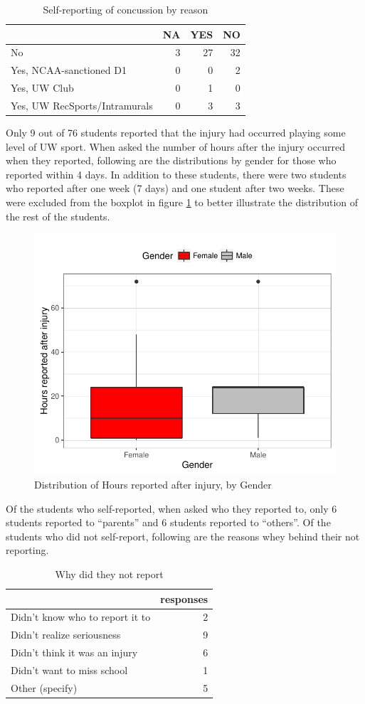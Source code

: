 \documentclass[11]{article}
\begin{document}
\begin{table}[H]
\centering
\begin{tabular}{lrrr}
  \hline
 & NA & YES & NO \\ 
  \hline
No &   3 &  27 &  32 \\ 
  Yes, NCAA-sanctioned D1 &   0 &   0 &   2 \\ 
  Yes, UW Club &   0 &   1 &   0 \\ 
  Yes, UW RecSports/Intramurals &   0 &   3 &   3 \\ 
   \hline
\end{tabular}
\caption{Self-reporting of concussion by reason} 
\label{tab:Tab7Reason}
\end{table}Only 9 out of 76 students reported that the injury had occurred playing some level of UW sport. When asked the number of hours after the injury occurred when they reported, following are the distributions by gender for those who reported within 4 days. In addition to these students, there were two students who reported after one week (7 days) and one student after two weeks. These were excluded from the boxplot in figure \ref{fig:Fig3HoursGender} to better illustrate the distribution of the rest of the students.
\begin{figure}[H]
\centering
\includegraphics[width=0.5\linewidth]{Plot2ReportHours.pdf}
\caption{Distribution of Hours reported after injury, by Gender}
\label{fig:Fig3HoursGender}
\end{figure}

Of the students who self-reported, when asked who they reported to, only 6 students reported to ``parents'' and 6 students reported to ``others''. Of the students who did not self-report, following are the reasons whey behind their not reporting.
\begin{table}[H]
\centering
\begin{tabular}{l|r}
  \hline
 & responses \\ 
  \hline
Didn’t know who to report it to &   2 \\ 
  Didn’t realize seriousness &   9 \\ 
  Didn’t think it was an injury &   6 \\ 
  Didn’t want to miss school &   1 \\ 
  Other (specify) &   5 \\ 
   \hline
\end{tabular}
\caption{Why did they not report} 
\label{tab:Tab8WhyNot}
\end{table}
\end{document}

